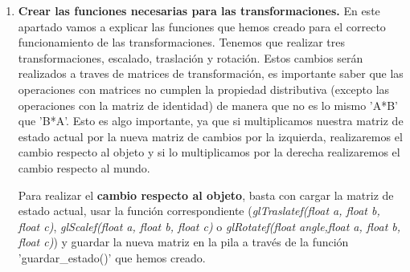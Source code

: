 \documentclass[12pt,a4paper]{article}
\begin{document}
\begin{enumerate}
\begin{lstlisting}
    case 'b':
    case 'B':
        printf("Usted acaba de activar el modo de rotacion\n");
        modo=2;
        break;
    break;

    case 't':
    case 'T':
        printf("Usted acaba de activar el modo de escalado\n");
        modo=3;
        break;
    break;

    case 'm':
    case 'M':
        printf("Usted acaba de activar el modo de traslacion\n");
        modo=1;
        break;
    break;

    case 26: //Control + z Tenemos que volver al estado anterior
        printf("Deshacer cambios\n");
        deshacer();
    break;
    ...
    ...
    ...
}

\end{lstlisting}





\item \textbf{Crear las funciones necesarias para las transformaciones.}\newline
En este apartado vamos a explicar las funciones que hemos creado para el correcto funcionamiento de las transformaciones. Tenemos que realizar tres transformaciones, escalado, traslación y rotación. Estos cambios serán realizados a traves de matrices de transformación, es importante saber que las operaciones con matrices no cumplen la propiedad distributiva (excepto las operaciones con la matriz de identidad) de manera que no es lo mismo 'A*B' que 'B*A'. Esto es algo importante, ya que si multiplicamos nuestra matriz de estado actual por la nueva matriz de cambios por la izquierda, realizaremos el cambio respecto al objeto y si lo multiplicamos por la derecha realizaremos el cambio respecto al mundo.\newline

Para realizar el \textbf{cambio respecto al objeto}, basta con cargar la matriz de estado actual, usar la función correspondiente (\textit{glTraslatef(float a, float b, float c)}, \textit{glScalef(float a, float b, float c)} o \textit{glRotatef(float angle,float a, float b, float c)}) y guardar la nueva matriz en la pila a través de la función 'guardar\_estado()' que hemos creado.\newline


\end{enumerate}
\end{document}

